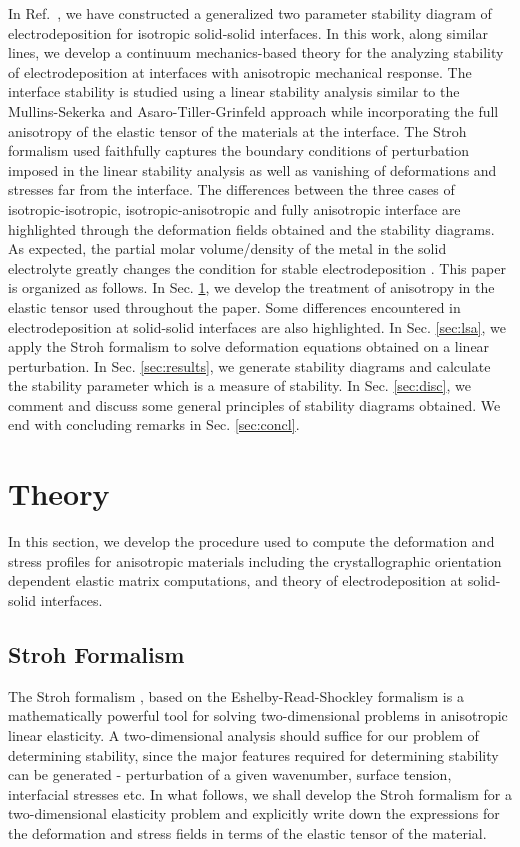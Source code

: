 \documentclass[%
reprint,
 amsmath,amssymb,
 aps,
 prb,
]{revtex4-1}
\begin{document}
In Ref.~, we have constructed a generalized two parameter stability diagram of electrodeposition for isotropic solid-solid interfaces. In this work, along similar lines, we develop a continuum mechanics-based theory for the analyzing stability of electrodeposition at interfaces with anisotropic mechanical response. The interface stability is studied using a linear stability analysis similar to the Mullins-Sekerka \cite{MullinsSekerka63, MullinsSekerka64} and Asaro-Tiller-Grinfeld approach \cite{Asaro1972, grinfeld1986} while incorporating the full anisotropy of the elastic tensor of the materials at the interface. The Stroh formalism used faithfully captures the boundary conditions of perturbation imposed in the linear stability analysis as well as vanishing of deformations and stresses far from the interface. The differences between the three cases of isotropic-isotropic, isotropic-anisotropic and fully anisotropic interface are highlighted through the deformation fields obtained and the stability diagrams. As expected, the partial molar volume/density of the metal in the solid electrolyte greatly changes the condition for stable electrodeposition \cite{Angheluta2009, ahmad2017stability}. This paper is organized as follows. In Sec. \ref{sec:theory}, we develop the treatment of anisotropy in the elastic tensor used throughout the paper. Some differences encountered in electrodeposition at solid-solid interfaces are also highlighted. In Sec. \ref{sec:lsa}, we apply the Stroh formalism to solve deformation equations obtained on a linear perturbation. In Sec. \ref{sec:results}, we generate stability diagrams and calculate the stability parameter which is a measure of stability. In Sec. \ref{sec:disc}, we comment and discuss some general principles of stability diagrams obtained. We end with concluding remarks in Sec. \ref{sec:concl}.


\section{Theory}\label{sec:theory}

In this section, we develop the procedure used to compute the deformation and stress profiles for anisotropic materials including the crystallographic orientation dependent elastic matrix computations, and theory of electrodeposition at solid-solid interfaces.

\subsection{Stroh Formalism}
The Stroh formalism \cite{stroh1958, stroh1962}, based on the Eshelby-Read-Shockley formalism \cite{erd1953} is a mathematically powerful tool for solving two-dimensional problems in anisotropic linear elasticity. A two-dimensional analysis should suffice for our problem of determining stability, since the major features required for determining stability can be generated - perturbation of a given wavenumber, surface tension, interfacial stresses etc. In what follows, we shall develop the Stroh formalism for a two-dimensional elasticity problem \cite{ting-anis} and explicitly write down the expressions for the deformation and stress fields in terms of the elastic tensor of the material.
\end{document}
